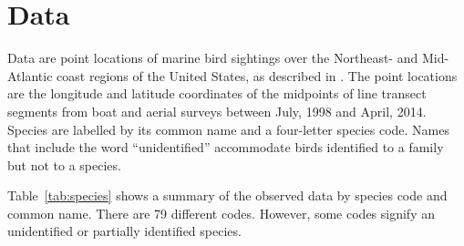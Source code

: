 \documentclass{statsoc}
\begin{document}
\section{Data}



Data are point locations of marine bird sightings over the Northeast- and Mid-Atlantic coast regions of the United States, as described in \cite{Balderama2016}. The point locations are the longitude and latitude coordinates of the midpoints of line transect segments from boat and aerial surveys between July, 1998 and April, 2014. Species are labelled by its common name and a four-letter species code. Names that include the word ``unidentified'' accommodate birds identified to a family but not to a species. 

Table~\ref{tab:species} shows a summary of the observed data by species code and common name. There are 79 different codes. However, some codes signify an unidentified or partially identified species.
\end{document}
